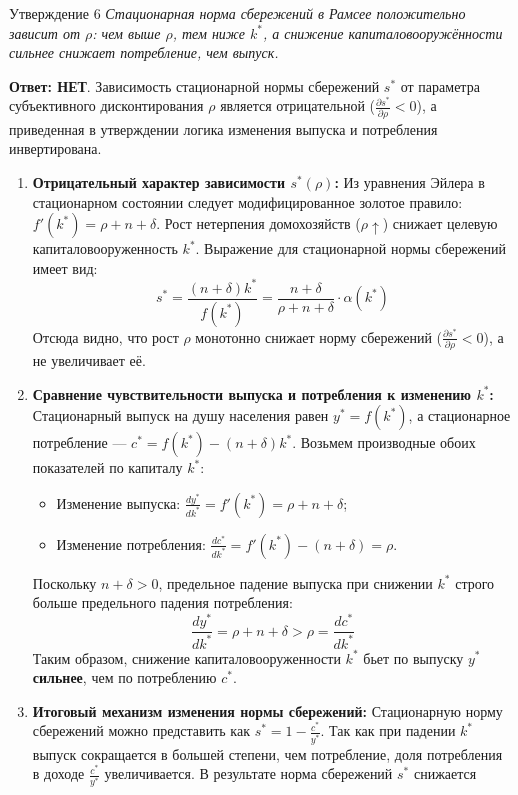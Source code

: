 \documentclass[10pt,a4paper]{article}
\newcommand{\qnet}{\textbf{\color{nored}Ответ: НЕТ}}
\newenvironment{answer}[2]{%
  \begin{qbox}{Утверждение #1}
  \textit{#2}\par\smallskip
}{%
  \end{qbox}\vspace{2pt}
}
\begin{document}
\begin{answer}{6}{Стационарная норма сбережений в Рамсее положительно зависит от $\rho$: чем выше $\rho$, тем ниже $k^*$, а снижение капиталовооружённости сильнее снижает потребление, чем выпуск.}
\qnet. Зависимость стационарной нормы сбережений $s^*$ от параметра субъективного дисконтирования $\rho$ является отрицательной ($\frac{\partial s^*}{\partial \rho} < 0$), а приведенная в утверждении логика изменения выпуска и потребления инвертирована.

\begin{enumerate}
    \item \textbf{Отрицательный характер зависимости $s^*(\rho)$:}
    Из уравнения Эйлера в стационарном состоянии следует модифицированное золотое правило: $f'(k^*) = \rho + n + \delta$. Рост нетерпения домохозяйств ($\rho \uparrow$) снижает целевую капиталовооруженность $k^*$. Выражение для стационарной нормы сбережений имеет вид:
    \[
    s^* = \frac{(n + \delta)k^*}{f(k^*)} = \frac{n + \delta}{\rho + n + \delta} \cdot \alpha(k^*)
    \]
    Отсюда видно, что рост $\rho$ монотонно снижает норму сбережений ($\frac{\partial s^*}{\partial \rho} < 0$), а не увеличивает её.

    \item \textbf{Сравнение чувствительности выпуска и потребления к изменению $k^*$:}
    Стационарный выпуск на душу населения равен $y^* = f(k^*)$, а стационарное потребление — $c^* = f(k^*) - (n + \delta)k^*$. Возьмем производные обоих показателей по капиталу $k^*$:
    \begin{itemize}
        \item Изменение выпуска: $\frac{dy^*}{dk^*} = f'(k^*) = \rho + n + \delta$;
        \item Изменение потребления: $\frac{dc^*}{dk^*} = f'(k^*) - (n + \delta) = \rho$.
    \end{itemize}
    Поскольку $n + \delta > 0$, предельное падение выпуска при снижении $k^*$ строго больше предельного падения потребления:
    \[
    \frac{dy^*}{dk^*} = \rho + n + \delta > \rho = \frac{dc^*}{dk^*}
    \]
    Таким образом, снижение капиталовооруженности $k^*$ бьет по выпуску $y^*$ \textbf{сильнее}, чем по потреблению $c^*$.

    \item \textbf{Итоговый механизм изменения нормы сбережений:}
    Стационарную норму сбережений можно представить как $s^* = 1 - \frac{c^*}{y^*}$. Так как при падении $k^*$ выпуск сокращается в большей степени, чем потребление, доля потребления в доходе $\frac{c^*}{y^*}$ увеличивается. В результате норма сбережений $s^*$ снижается
\end{enumerate}
\end{answer}
\end{document}
